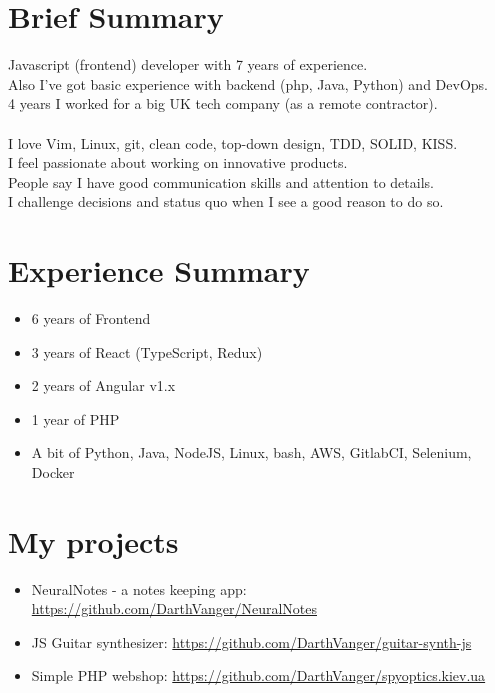 \documentclass[a4paper, 14pt]{article}
\begin{document}
\begin{center}
	\textsc{\Huge{}}
\end{center}


\section{Brief Summary}
  Javascript (frontend) developer with 7 years of experience.  \\
  Also I've got basic experience with backend (php, Java, Python) and DevOps.  \\
  4 years I worked for a big UK tech company (as a remote contractor). \\
  \\
  I love Vim, Linux, git, clean code, top-down design, TDD, SOLID, KISS. \\
  I feel passionate about working on innovative products. \\
  People say I have good communication skills and attention to details. \\
  I challenge decisions and status quo when I see a good reason to do so.

\section{Experience Summary}
  \begin{itemize}
    \item 6 years of Frontend  \\
    \item 3 years of React (TypeScript, Redux) \\
    \item 2 years of Angular v1.x \\ 
    \item 1 year of PHP \\
    \item A bit of Python, Java, NodeJS, Linux, bash, AWS, GitlabCI, Selenium, Docker
  \end{itemize}

\section{My projects}
  \begin{itemize}
    \item NeuralNotes - a notes keeping app: \url{https://github.com/DarthVanger/NeuralNotes} \\
    \item JS Guitar synthesizer: \url{https://github.com/DarthVanger/guitar-synth-js} \\
    \item Simple PHP webshop: \url{https://github.com/DarthVanger/spyoptics.kiev.ua}
  \end{itemize}
\end{document}
